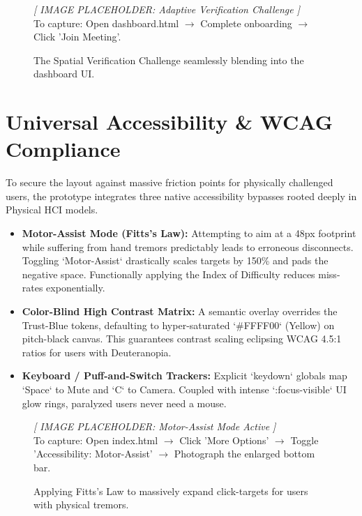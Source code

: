 \documentclass[12pt,a4paper]{article}
\begin{document}
\begin{figure}[H]
    \centering
    \begin{tcolorbox}[colback=gray!10,colframe=gray!50,arc=4mm,height=7cm,valign=center,halign=center]
        \large\textit{[ IMAGE PLACEHOLDER: Adaptive Verification Challenge ]}\\[0.5cm]
        \small To capture: Open dashboard.html $\rightarrow$ Complete onboarding $\rightarrow$ Click 'Join Meeting'.
    \end{tcolorbox}
    \caption{The Spatial Verification Challenge seamlessly blending into the dashboard UI.}
\end{figure}

\section{Universal Accessibility \& WCAG Compliance}
To secure the layout against massive friction points for physically challenged users, the prototype integrates three native accessibility bypasses rooted deeply in Physical HCI models.

\begin{itemize}
    \item \textbf{Motor-Assist Mode (Fitts's Law):} Attempting to aim at a 48px footprint while suffering from hand tremors predictably leads to erroneous disconnects. Toggling `Motor-Assist` drastically scales targets by 150\% and pads the negative space. Functionally applying the Index of Difficulty reduces miss-rates exponentially.
    \item \textbf{Color-Blind High Contrast Matrix:} A semantic overlay overrides the Trust-Blue tokens, defaulting to hyper-saturated `#FFFF00` (Yellow) on pitch-black canvas. This guarantees contrast scaling eclipsing WCAG 4.5:1 ratios for users with Deuteranopia.
    \item \textbf{Keyboard / Puff-and-Switch Trackers:} Explicit `keydown` globals map `Space` to Mute and `C` to Camera. Coupled with intense `:focus-visible` UI glow rings, paralyzed users never need a mouse.
\end{itemize}

\begin{figure}[H]
    \centering
    \begin{tcolorbox}[colback=gray!10,colframe=gray!50,arc=4mm,height=7cm,valign=center,halign=center]
        \large\textit{[ IMAGE PLACEHOLDER: Motor-Assist Mode Active ]}\\[0.5cm]
        \small To capture: Open index.html $\rightarrow$ Click 'More Options' $\rightarrow$ Toggle 'Accessibility: Motor-Assist' $\rightarrow$ Photograph the enlarged bottom bar.
    \end{tcolorbox}
    \caption{Applying Fitts's Law to massively expand click-targets for users with physical tremors.}
\end{figure}
\newpage
\end{document}
